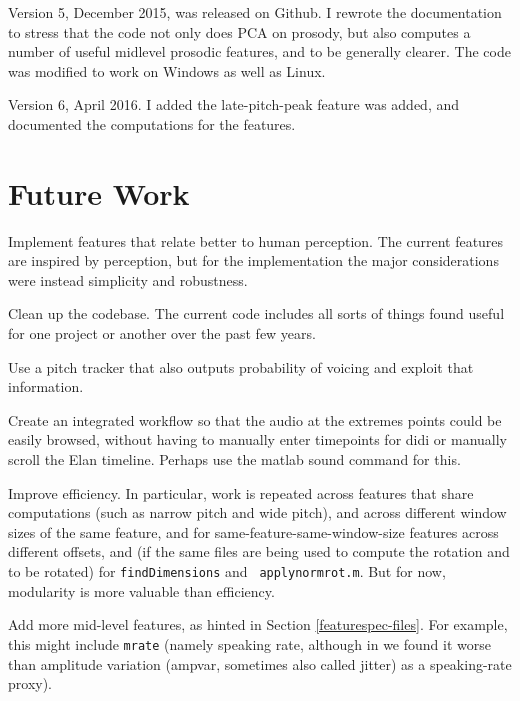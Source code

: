 \documentclass[11pt]{article}
\begin{document}
Version 5, December 2015, was released on Github.  I rewrote the
documentation to stress that the code not only does PCA on prosody,
but also computes a number of useful midlevel prosodic features, and
to be generally clearer.  The code was modified to work on Windows as
well as Linux.  

Version 6, April 2016.  I added the late-pitch-peak feature was added, and
documented the computations for the features.


\section{Future Work}

Implement features that relate better to human perception.  The
current features are inspired by perception, but for the
implementation the major considerations were instead simplicity and
robustness.

Clean up the codebase.  The current code includes
all sorts of things found useful for one project or another over the past
few years.

Use a pitch tracker that also outputs probability
of voicing and exploit that information.

Create an integrated workflow so that the audio at the extremes points
could be easily browsed, without having to manually enter timepoints
for didi or manually scroll the Elan timeline.  Perhaps use the matlab
sound command for this.

Improve efficiency.  In particular,
work is repeated across features that share computations (such as
narrow pitch and wide pitch), and across different window sizes of the
same feature, and for same-feature-same-window-size features across
different offsets, and (if the same files are being used to compute
the rotation and to be rotated) for {\tt findDimensions} and {\tt
  applynormrot.m}.  But for now, modularity is more valuable than
efficiency.

Add more mid-level features, as hinted in Section
\ref{featurespec-files}.  For example, this might include {\tt mrate}
(namely speaking rate, although in \cite{timelm} we found it worse
than amplitude variation (ampvar, sometimes also called jitter) as a
speaking-rate proxy).

%
\end{document}
